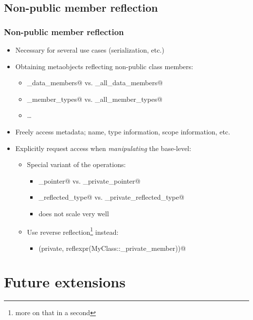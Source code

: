 \documentclass[compress,table,xcolor=table]{beamer}
\begin{document}
\subsection{Non-public member reflection}
\begin{frame}[fragile]
\frametitle{Non-public member reflection}
  \small
  \begin{itemize}
    \item Necessary for several use cases (serialization, etc.)
    \item Obtaining metaobjects reflecting non-public class members:
    \begin{itemize}
      \footnotesize
      \item \verb@get_data_members@ vs. \verb@get_all_data_members@
      \item \verb@get_member_types@ vs. \verb@get_all_member_types@
      \item \ldots
    \end{itemize}
    \item Freely access metadata; name, type information, scope information, etc.
    \item Explicitly request access when {\em manipulating} the base-level:
    \begin{itemize}
      \footnotesize
        \item Special variant of the operations:
        \begin{itemize}
          \scriptsize
          \item \verb@get_pointer@ vs. \verb@get_private_pointer@
          \item \verb@get_reflected_type@ vs. \verb@get_private_reflected_type@
          \item does not scale very well
        \end{itemize}
        \item Use reverse reflection\footnote{more on that in a second} instead:
        \begin{itemize}
          \scriptsize
          \item \verb@reflexpr(private, reflexpr(MyClass::_private_member))@
        \end{itemize}
    \end{itemize}
  \end{itemize}
\end{frame}

\section{Future extensions}
\end{document}
